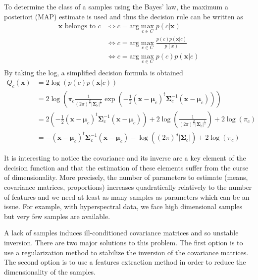 \documentclass[a4paper]{article}
\begin{document}
    To determine the class of a samples using the Bayes' law, the maximum a posteriori (MAP) estimate is used and thus the decision rule can be written as
    \begin{align*}
        \mathbf{x} \text{ belongs to } c &\Leftrightarrow c = \text{arg} \max_{c \in C} p(c|\mathbf{x}) \\
                                         &\Leftrightarrow c = \text{arg} \max_{c \in C} \frac{p(c) p(\mathbf{x}|c)}{p(x)} \\
                                         &\Leftrightarrow c = \text{arg} \max_{c \in C} p(c) p(\mathbf{x}|c) \\
    \end{align*}
    By taking the log, a simplified decision formula is obtained
    \begin{align}
        Q_c(\mathbf{x})
        &= 2 \log \left( p(c) p(\mathbf{x}|c) \right) \nonumber \\
        &= 2 \log \left( \pi_c \frac{1}{(2\pi)^{\frac{d}{2}} |\boldsymbol{\Sigma}_c|^{\frac{1}{2}}} \exp \left( -\frac{1}{2} (\mathbf{x} - \boldsymbol{\mu}_c)^t \boldsymbol{\Sigma}_c^{-1} (\mathbf{x} - \boldsymbol{\mu}_c) \right) \right) \nonumber \\
        &= 2 \left( -\frac{1}{2} (\mathbf{x} - \boldsymbol{\mu}_c)^t \boldsymbol{\Sigma}_c^{-1} (\mathbf{x} - \boldsymbol{\mu}_c) \right) + 2 \log \left( \frac{1}{(2\pi)^{\frac{d}{2}} |\boldsymbol{\Sigma}_c|^{\frac{1}{2}}} \right) + 2 \log (\pi_c) \nonumber \\
        &= - (\mathbf{x} - \boldsymbol{\mu}_c)^t \boldsymbol{\Sigma}_c^{-1} (\mathbf{x} - \boldsymbol{\mu}_c) - \log ((2\pi)^d|\boldsymbol{\Sigma}_c|) + 2 \log (\pi_c)
        \label{eq:decision}
    \end{align}

    It is interesting to notice the covariance and its inverse are a key element of the decision function and that the estimation of these elements suffer from the curse of dimensionality. More precisely, the number of parameters to estimate (means, covariance matrices, proportions) increases quadratically relatively to the number of features and we need at least as many samples as parameters which can be an issue. For example, with hyperspectral data, we face high dimensional samples but very few samples are available.

    A lack of samples induces ill-conditioned covariance matrices and so unstable inversion. There are two major solutions to this problem. The first option is to use a regularization method to stabilize the inversion of the covariance matrices. The second option is to use a features extraction method in order to reduce the dimensionality of the samples.
\end{document}
